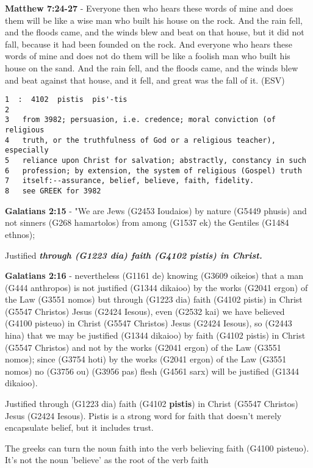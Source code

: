 \documentclass[11pt]{article}
\begin{document}
\textbf{Matthew 7:24-27} - Everyone then who hears these words of mine and does them will be like a wise man who built his house on the rock. And the rain fell, and the floods came, and the winds blew and beat on that house, but it did not fall, because it had been founded on the rock. And everyone who hears these words of mine and does not do them will be like a foolish man who built his house on the sand. And the rain fell, and the floods came, and the winds blew and beat against that house, and it fell, and great was the fall of it. (ESV)

\begin{verbatim}
1  :  4102  pistis  pis'-tis
2  
3   from 3982; persuasion, i.e. credence; moral conviction (of religious
4   truth, or the truthfulness of God or a religious teacher), especially
5   reliance upon Christ for salvation; abstractly, constancy in such
6   profession; by extension, the system of religious (Gospel) truth
7   itself:--assurance, belief, believe, faith, fidelity.
8   see GREEK for 3982
\end{verbatim}

\textbf{Galatians 2:15} - "We are Jews (G2453 Ioudaios) by nature (G5449 phusis) and not sinners (G268 hamartolos) from among (G1537 ek) the Gentiles (G1484 ethnos);

Justified \emph{\textbf{through (G1223 dia) faith (G4102 pistis) in Christ.}}

\textbf{Galatians 2:16} - nevertheless (G1161 de) knowing (G3609 oikeios) that a man (G444 anthropos) is not justified (G1344 dikaioo) by the works (G2041 ergon) of the Law (G3551 nomos) but through (G1223 dia) faith (G4102 pistis) in Christ (G5547 Christos) Jesus (G2424 Iesous), even (G2532 kai) we have believed (G4100 pisteuo) in Christ (G5547 Christos) Jesus (G2424 Iesous), so (G2443 hina) that we may be justified (G1344 dikaioo) by faith (G4102 pistis) in Christ (G5547 Christos) and not by the works (G2041 ergon) of the Law (G3551 nomos); since (G3754 hoti) by the works (G2041 ergon) of the Law (G3551 nomos) no (G3756 ou) (G3956 pas) flesh (G4561 sarx) will be justified (G1344 dikaioo).

Justified through (G1223 dia) faith (G4102 \textbf{pistis}) in Christ (G5547 Christos) Jesus (G2424 Iesous).
Pistis is a strong word for faith that doesn't merely encapsulate belief, but it includes trust.

The greeks can turn the noun faith into the verb believing faith (G4100 pisteuo).
It's not the noun 'believe' as the root of the verb faith
\end{document}
